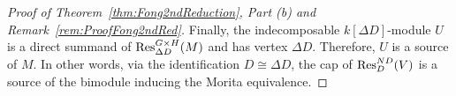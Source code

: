 \begin{proof}[Proof of Theorem~\ref{thm:Fong2ndReduction}, Part {\rm(b)} and
Remark~\ref{rem:ProofFong2ndRed}]{\leavevmode}
Finally, the indecomposable $k[\Delta D]$-module $U$ is a direct summand of $\operatorname{Res}_{\Delta D}^{G\times H}(M)$ and has vertex $\Delta D$. Therefore, $U$ is a source of
$M$. In other words, via the identification
$D\cong\Delta D$, the cap of $\operatorname{Res}_D^{ND}(V)$ is a source of the bimodule inducing the Morita equivalence.
\end{proof}

